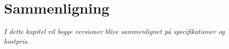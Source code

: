 \chapter{Sammenligning}\label{kap:sammenligning}

\emph{I dette kapitel vil begge versioner blive sammenlignet på specifikationer og kostpris.}